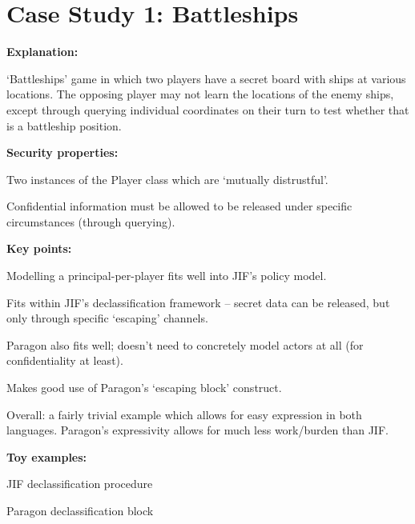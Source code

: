 \section{Case Study 1: Battleships}

\textbf{Explanation:}

`Battleships' game in which two players have a secret board with ships at various locations. The opposing player may not learn the locations of the enemy ships, except through querying individual coordinates on their turn to test whether that is a battleship position.

\textbf{Security properties:}

Two instances of the Player class which are `mutually distrustful'.

Confidential information must be allowed to be released under specific circumstances (through querying).

\textbf{Key points:}

Modelling a principal-per-player fits well into JIF's policy model.

Fits within JIF's declassification framework -- secret data can be released, but only through specific `escaping' channels.

Paragon also fits well; doesn't need to concretely model actors at all (for confidentiality at least).

Makes good use of Paragon's `escaping block' construct.

Overall: a fairly trivial example which allows for easy expression in both languages. Paragon's expressivity allows for much less work/burden than JIF.

\textbf{Toy examples:}

JIF declassification procedure

Paragon declassification block